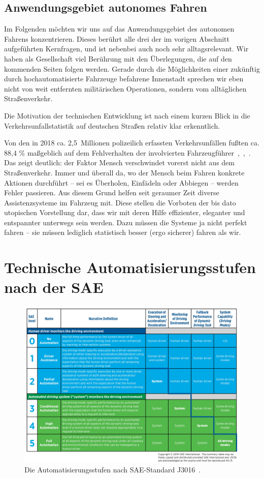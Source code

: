 \documentclass[twocolumn, german]{tum-article}
\begin{document}
\subsection{Anwendungsgebiet autonomes Fahren}
Im Folgenden möchten wir uns auf das Anwendungsgebiet des autonomen Fahrens konzentrieren.
Dieses berührt alle drei der im vorigen Abschnitt aufgeführten Kernfragen, und ist nebenbei auch noch sehr alltagsrelevant.
Wir haben als Gesellschaft viel Berührung mit den Überlegungen, die auf den kommenden Seiten folgen werden.
Gerade durch die Möglichkeiten einer zukünftig durch hochautomatisierte Fahrzeuge befahrene Innenstadt sprechen wir eben nicht von weit entfernten militärischen Operationen, sondern vom alltäglichen Straßenverkehr.

Die Motivation der technischen Entwicklung ist nach einem kurzen Blick in die Verkehrsunfallstatistik auf deutschen Straßen relativ klar erkenntlich.

Von den in 2018 ca. 2,5~Millionen polizeilich erfassten Verkehrsunfällen fußten ca. 88,4 \% maßgeblich auf dem Fehlverhalten der involvierten Fahrzeugführer~\cite{kba-zulass},~\cite{destatis-grafik},~\cite{destatis-unfallaktuell}.
Das zeigt deutlich: der Faktor Mensch verschwindet vorerst nicht aus dem Straßenverkehr.
Immer und überall da, wo der Mensch beim Fahren konkrete Aktionen durchführt -- sei es Überholen, Einfädeln oder Abbiegen -- werden Fehler passieren.
Aus diesem Grund helfen seit geraumer Zeit diverse Assistenzsysteme im Fahrzeug mit.
Diese stellen die Vorboten der bis dato utopischen Vorstellung dar, dass wir mit deren Hilfe effizienter, eleganter und entspannter unterwegs sein werden.
Dazu müssen die Systeme ja nicht perfekt fahren -- sie müssen lediglich statistisch besser (ergo sicherer) fahren als wir.


\section{Technische Automatisierungsstufen nach der SAE}
\begin{figure}
	\includegraphics[width=\textwidth]{media/sae-summary}
	\caption{Die Automatisierungsstufen nach SAE-Standard J3016~\cite{sae-summary}.}
	\label{fig:sae-levels-img}
\end{figure}
\end{document}

